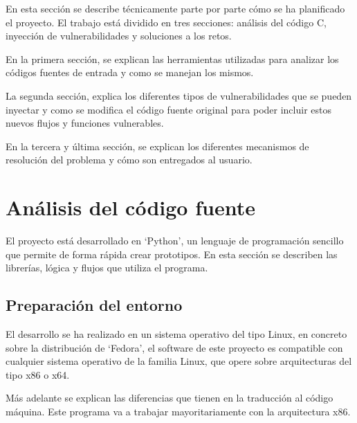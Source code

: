 En esta sección se describe técnicamente parte por parte cómo se ha planificado el proyecto. El trabajo está dividido en tres secciones: análisis del código C, inyección de vulnerabilidades y soluciones a los retos.

En la primera sección, se explican las herramientas utilizadas para analizar los códigos fuentes de entrada y como se manejan los mismos.

La segunda sección, explica los diferentes tipos de vulnerabilidades que se pueden inyectar y como se modifica el código fuente original para poder incluir estos nuevos flujos y funciones vulnerables.

En la tercera y última sección, se explican los diferentes mecanismos de resolución del problema y cómo son entregados al usuario.
\section{Análisis del código fuente}
El proyecto está desarrollado en `Python', un lenguaje de programación sencillo que permite de forma rápida crear prototipos. En esta sección se describen las librerías, lógica y flujos que utiliza el programa.

\subsection{Preparación del entorno}
El desarrollo se ha realizado en un sistema operativo del tipo Linux, en concreto sobre la distribución de `Fedora', el software de este proyecto es compatible con cualquier sistema operativo de la familia Linux, que opere sobre arquitecturas del tipo \acrfull{x86} o \acrfull{x64}.

Más adelante se explican las diferencias que tienen en la traducción al código máquina. Este programa va a trabajar mayoritariamente con la arquitectura \acrshort{x86}.

